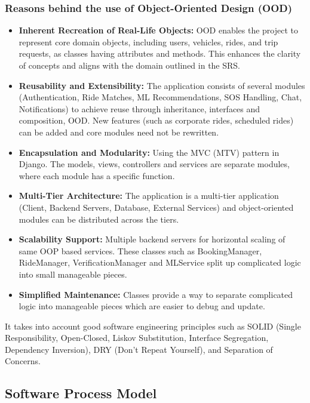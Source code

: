 \subsubsection{Reasons behind the use of Object-Oriented Design (OOD)}

\begin{itemize}
    \item \textbf{Inherent Recreation of Real-Life Objects:} OOD enables the project to represent core domain objects, including users, vehicles, rides, and trip requests, as classes having attributes and methods. This enhances the clarity of concepts and aligns with the domain outlined in the SRS.
    \item \textbf{Reusability and Extensibility:} The application consists of several modules (Authentication, Ride Matches, ML Recommendations, SOS Handling, Chat, Notifications) to achieve reuse through inheritance, interfaces and composition, OOD. New features (such as corporate rides, scheduled rides) can be added and core modules need not be rewritten.
    \item \textbf{Encapsulation and Modularity:} Using the MVC (MTV) pattern in Django. The models, views, controllers and services are separate modules, where each module has a specific function.
    \item \textbf{Multi-Tier Architecture:} The application is a multi-tier application (Client, Backend Servers, Database, External Services) and object-oriented modules can be distributed across the tiers.
    \item \textbf{Scalability Support:} Multiple backend servers for horizontal scaling of same OOP based services. These classes such as BookingManager, RideManager, VerificationManager and MLService split up complicated logic into small manageable pieces.
    \item \textbf{Simplified Maintenance:} Classes provide a way to separate complicated logic into manageable pieces which are easier to debug and update.
\end{itemize}

It takes into account good software engineering principles such as SOLID (Single Responsibility, Open-Closed, Liskov Substitution, Interface Segregation, Dependency Inversion), DRY (Don't Repeat Yourself), and Separation of Concerns.

\subsection{Software Process Model}

